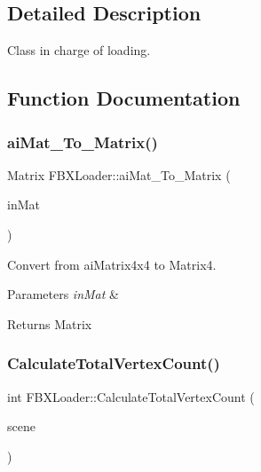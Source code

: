 \subsection{Detailed Description}
Class in charge of loading. 

\subsection{Function Documentation}
\mbox{\label{namespaceFBXLoader_adc013872047ea03643d9763d8c7a4afb}} 
\subsubsection{\texorpdfstring{ai\+Mat\+\_\+\+To\+\_\+\+Matrix()}{aiMat\_To\_Matrix()}}
{\footnotesize\ttfamily Matrix F\+B\+X\+Loader\+::ai\+Mat\+\_\+\+To\+\_\+\+Matrix (\begin{DoxyParamCaption}\item[{ai\+Matrix4x4 const \&}]{in\+Mat }\end{DoxyParamCaption})}



Convert from ai\+Matrix4x4 to Matrix4. 


\begin{DoxyParams}{Parameters}
{\em in\+Mat} & \\
\hline
\end{DoxyParams}
\begin{DoxyReturn}{Returns}
Matrix 
\end{DoxyReturn}
\mbox{\label{namespaceFBXLoader_ac93d38d8445e4d743a879a0ffcaabef0}} 
\subsubsection{\texorpdfstring{Calculate\+Total\+Vertex\+Count()}{CalculateTotalVertexCount()}}
{\footnotesize\ttfamily int F\+B\+X\+Loader\+::\+Calculate\+Total\+Vertex\+Count (\begin{DoxyParamCaption}\item[{ai\+Scene const $\ast$}]{scene }\end{DoxyParamCaption})}



